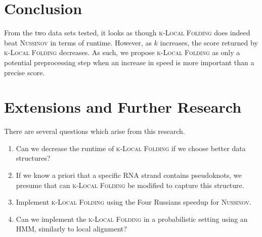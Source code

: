 \documentclass[11pt]{article}
\newcommand{\klf}{\textsc{k-Local Folding}\xspace}
\newcommand{\rf}{\textsc{Nussinov}\xspace}
\begin{document}
\section{Conclusion}

From the two data sets tested, it looks as though \klf does indeed beat \rf in terms of runtime. However, as $k$ increases, the score returned by \klf decreases. As such, we propose \klf as only a potential preprocessing step when an increase in speed is more important than a precise score. 


\section{Extensions and Further Research}
There are several questions which arise from this research. 
\begin{enumerate}
\item Can we decrease the runtime of \klf if we choose better data structures?
\item If we know a priori that a specific RNA strand contains pseudoknots, we presume that can \klf be modified to capture this structure. 
\item Implement \klf using the Four Russians speedup for \rf. 
\item Can we implement the \klf in a probabilistic setting using an HMM, similarly to local alignment?
\end{enumerate}




\end{document}
